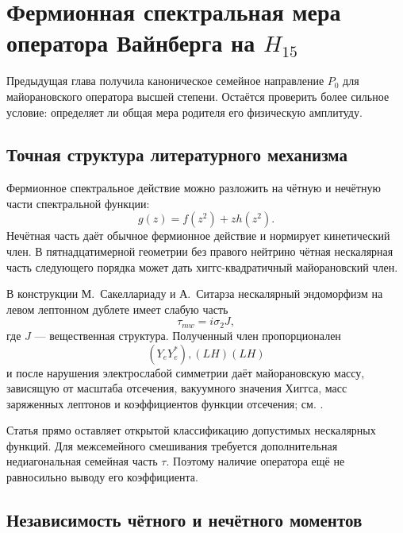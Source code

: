 \chapter{Фермионная спектральная мера оператора Вайнберга на \texorpdfstring{$H_{15}$}{H15}}

Предыдущая глава получила каноническое семейное направление $P_0$ для
майорановского оператора высшей степени. Остаётся проверить более сильное
условие: определяет ли общая мера родителя его физическую амплитуду.

\section{Точная структура литературного механизма}

Фермионное спектральное действие можно разложить на чётную и нечётную
части спектральной функции:
\begin{equation}
 g(z)=f(z^2)+z h(z^2).
 \label{eq:v5-fermionic-even-odd}
\end{equation}
Нечётная часть даёт обычное фермионное действие и нормирует кинетический
член. В пятнадцатимерной геометрии без правого нейтрино чётная
нескалярная часть следующего порядка может дать хиггс-квадратичный
майорановский член.

В конструкции М.~Сакеллариаду и А.~Ситарза нескалярный эндоморфизм на
левом лептонном дублете имеет слабую часть
\begin{equation}
 \tau_{
m w}=i\sigma_2J,
\end{equation}
где $J$ --- вещественная структура. Полученный член пропорционален
\begin{equation}
 (Y_eY_e^*),(LH)(LH)
\end{equation}
и после нарушения электрослабой симметрии даёт майорановскую массу,
зависящую от масштаба отсечения, вакуумного значения Хиггса, масс
заряженных лептонов и коэффициентов функции отсечения; см.
.

Статья прямо оставляет открытой классификацию допустимых нескалярных
функций. Для межсемейного смешивания требуется дополнительная
недиагональная семейная часть $\tau$. Поэтому наличие оператора ещё не
равносильно выводу его коэффициента.

\section{Независимость чётного и нечётного моментов}

